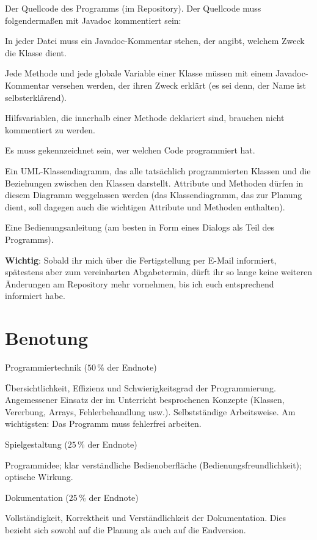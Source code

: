\begin{compactitem}
\item Der Quellcode des Programms (im Repository). Der Quellcode muss
folgendermaßen mit Javadoc kommentiert sein:

\begin{compactitem}
\item In jeder Datei muss ein Javadoc-Kommentar stehen, der angibt, welchem
Zweck die Klasse dient.
\item Jede Methode und jede globale Variable einer Klasse müssen mit einem
Javadoc-Kommentar versehen werden, der ihren Zweck erklärt (es sei denn, der
Name ist selbsterklärend).
\item Hilfsvariablen, die innerhalb einer Methode deklariert sind, brauchen
nicht kommentiert zu werden.
\item Es muss gekennzeichnet sein, wer welchen Code programmiert hat.
\end{compactitem}

\item Ein UML-Klassendiagramm, das alle tatsächlich programmierten Klassen und
die Beziehungen zwischen den Klassen darstellt. Attribute und Methoden dürfen
in diesem Diagramm weggelassen werden (das Klassendiagramm, das zur Planung
dient, soll dagegen auch die wichtigen Attribute und Methoden enthalten).

\item Eine Bedienungsanleitung (am besten in Form eines Dialogs als Teil des
Programms).

\end{compactitem}

\textbf{Wichtig}: Sobald ihr mich über die Fertigstellung per E-Mail informiert,
spätestens aber zum vereinbarten Abgabetermin, dürft ihr so lange keine weiteren
Änderungen am Repository mehr vornehmen, bis ich euch entsprechend informiert
habe.


\section{Benotung}

\begin{compactenum}[a)]
\item Programmiertechnik ($50\,\%$ der Endnote)

Übersichtlichkeit, Effizienz und Schwierigkeitsgrad der Programmierung.
Angemessener Einsatz der im Unterricht besprochenen Konzepte (Klassen,
Vererbung, Arrays, Fehlerbehandlung usw.). Selbstständige Arbeitsweise.
Am wichtigsten: Das Programm muss fehlerfrei arbeiten.

\item Spielgestaltung ($25\,\%$ der Endnote)

Programmidee; klar verständliche Bedienoberfläche (Bedienungsfreundlichkeit);
optische Wirkung.

\item Dokumentation ($25\,\%$ der Endnote)

Vollständigkeit, Korrektheit und Verständlichkeit der Dokumentation. Dies
bezieht sich sowohl auf die Planung als auch auf die Endversion.
\end{compactenum}
